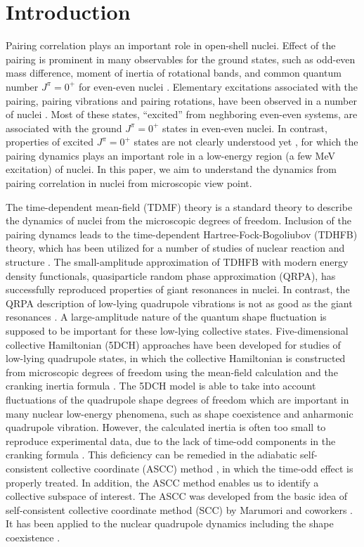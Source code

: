 \documentclass[%
superscriptaddress,
showpacs,
nofootinbib,
amsmath,amssymb,
aps,
prc,
twocolumn,
floatfix ]%
{revtex4-1}
\begin{document}
\section{Introduction}
Pairing correlation plays an important role in open-shell nuclei.
Effect of the pairing is prominent in many observables for the ground states,
such as odd-even mass difference, moment of inertia of rotational bands,
and common quantum number $J^\pi=0^+$ for even-even nuclei \cite{RS80}.
Elementary excitations associated with the pairing,
pairing vibrations and pairing rotations,
have been observed in a number of nuclei \cite{BB05}.
Most of these states, ``excited'' from neghboring even-even systems,
are associated with the ground $J^\pi=0^+$ states in even-even nuclei.
In contrast, properties of excited $J^{\pi}=0^+$ states are not clearly
understood yet \cite{HW11, G01}, for which the pairing dynamics plays
an important role in a low-energy region (a few MeV excitation) of nuclei. 
In this paper,
we aim to understand the dynamics from pairing correlation in nuclei
from microscopic view point.

The time-dependent mean-field (TDMF) theory is a standard theory to describe
the dynamics of nuclei from the microscopic degrees of freedom.
Inclusion of the pairing dynamcs leads to the
time-dependent Hartree-Fock-Bogoliubov (TDHFB) theory,
which has been utilized for a number of studies of nuclear reaction
and structure \cite{NMMY16}.
The small-amplitude approximation of TDHFB with modern energy density
functionals, quasiparticle random phase approximation (QRPA), 
has successfully reproduced properties of giant resonances in nuclei.
In contrast, the QRPA description of low-lying quadrupole vibrations
is not as good as the giant resonances \cite{NMMY16}.
A large-amplitude nature of the quantum shape fluctuation is supposed to
be important for these low-lying collective states.
Five-dimensional collective Hamiltonian (5DCH) approaches
have been developed for studies of low-lying quadrupole states,
in which the collective Hamiltonian is constructed from
microscopic degrees of freedom using the mean-field calculation and
the cranking inertia formula \cite{???}.
The 5DCH model is able to take into account fluctuations of
the quadrupole shape degrees of freedom which are important in many
nuclear low-energy phenomena, such as
shape coexistence and anharmonic quadrupole vibration.
However, the calculated inertia is often too small to reproduce
experimental data, due to the lack of time-odd components
in the cranking formula \cite{RS80}.
This deficiency can be remedied in the adiabatic self-consistent collective
coordinate (ASCC) method \cite{MNM00},
in which the time-odd effect is properly treated.
In addition, the ASCC method enables us to identify a collective subspace
of interest.
The ASCC was developed from the basic idea of self-consistent
collective coordinate method (SCC) by Marumori and coworkers \cite{MMSK80}.
It has been applied to the nuclear quadrupole dynamics including
the shape coexistence \cite{KNMM05, HNMM07, HNMM08}.
\end{document}
